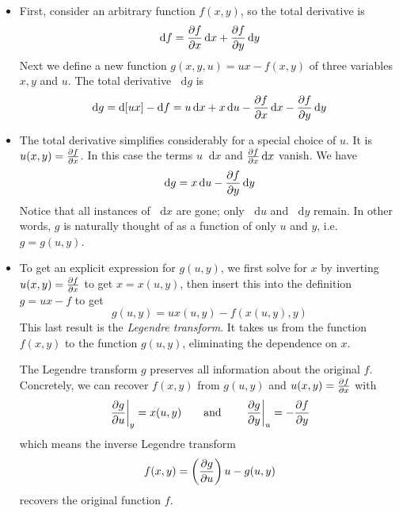 \documentclass[11pt, a4paper]{article}
\newcommand{\eqtext}[1]{\qquad \text{#1} \qquad}
\newcommand{\diff}{\mathop{}\!\mathrm{d}} %
\begin{document}
\begin{itemize}
	
	\item First, consider an arbitrary function $ f(x, y) $, so the total derivative is
	\begin{equation*}
		\diff f = \pdv{f}{x} \diff x + \pdv{f}{y} \diff y
	\end{equation*}
	Next we define a new function $ g(x, y, u) = ux - f(x, y)$ of three variables $ x, y $ and $ u $. The total derivative $ \diff g $ is
	\begin{equation*}
		\diff g = \diff [ux] - \diff f = u \diff x + x \diff u - \pdv{f}{x} \diff x - \pdv{f}{y} \diff y
	\end{equation*}
	
	\item The total derivative simplifies considerably for a special choice of $ u $. It is $ u(x, y) = \pdv{f}{x}$. In this case the terms $ u \diff x  $ and $ \pdv{f}{x} \diff x $ vanish. We have
	\begin{equation*}
		\diff g = x \diff u - \pdv{f}{y}\diff y
	\end{equation*}
	Notice that all instances of $ \diff x $ are gone; only $ \diff u $ and $ \diff y $ remain. In other words, $ g $ is naturally thought of as a function of only $ u $ and $ y $, i.e. $ g = g(u, y) $.
	
	\item To get an explicit expression for $ g(u, y) $, we first solve for $ x $ by inverting $ u(x, y) = \pdv{f}{x} $ to get $ x = x(u, y) $, then insert this into the definition $ g = ux - f $ to get
	\begin{equation*}
		g(u, y) = u x(u, y) - f(x(u, y), y)
	\end{equation*}
	This last result is the \textit{Legendre transform}. It takes us from the function $ f(x, y) $ to the function $ g(u, y) $, eliminating the dependence on $ x $.
	
	The Legendre transform $ g $ preserves all information about the original $ f $. Concretely, we can recover $ f(x, y) $ from $ g(u, y) $ and $ u(x, y) = \pdv{f}{x} $ with
	\begin{equation*}
		\eval{\pdv{g}{u}}_{y} = x(u, y) \eqtext{and} 	\eval{\pdv{g}{y}}_{u} = - \pdv{f}{y}
	\end{equation*}
	which means the inverse Legendre transform
	\begin{equation*}
		f(x, y) = \left(\pdv{g}{u}\right) u - g(u, y)
	\end{equation*}
	recovers the original function $ f $.
\end{itemize}
\end{document}
